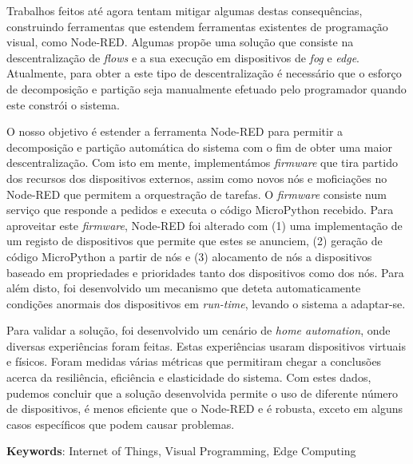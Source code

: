 Trabalhos feitos até agora tentam mitigar algumas destas consequências, construindo ferramentas que estendem ferramentas existentes de programação visual, como Node-RED. Algumas propõe uma solução que consiste na descentralização de \emph{flows} e a sua execução em dispositivos de \emph{fog} e \emph{edge}. Atualmente, para obter a este tipo de descentralização é necessário que o esforço de decomposição e partição seja manualmente efetuado pelo programador quando este constrói o sistema.

O nosso objetivo é estender a ferramenta Node-RED para permitir a decomposição e partição automática do sistema com o fim de obter uma maior descentralização. Com isto em mente, implementámos \textit{firmware} que tira partido dos recursos dos dispositivos externos, assim como novos nós e moficiações no Node-RED que permitem a orquestração de tarefas. O \textit{firmware} consiste num serviço que responde a pedidos e executa o código MicroPython recebido. Para aproveitar este \textit{firmware}, Node-RED foi alterado com (1) uma implementação de um registo de dispositivos que permite que estes se anunciem, (2) geração de código MicroPython a partir de nós e (3) alocamento de nós a dispositivos baseado em propriedades e prioridades tanto dos dispositivos como dos nós. Para além disto, foi desenvolvido um mecanismo que deteta automaticamente condições anormais dos dispositivos em \emph{run-time}, levando o sistema a adaptar-se.

Para validar a solução, foi desenvolvido um cenário de \textit{home automation}, onde diversas experiências foram feitas. Estas experiências usaram dispositivos virtuais e físicos. Foram medidas várias métricas que permitiram chegar a conclusões acerca da resiliência, eficiência e elasticidade do sistema. Com estes dados, pudemos concluir que a solução desenvolvida permite o uso de diferente número de dispositivos, é menos eficiente que o Node-RED e é robusta, exceto em alguns casos específicos que podem causar problemas.

\vspace*{10mm}\noindent
\textbf{Keywords}: Internet of Things, Visual Programming, Edge Computing
